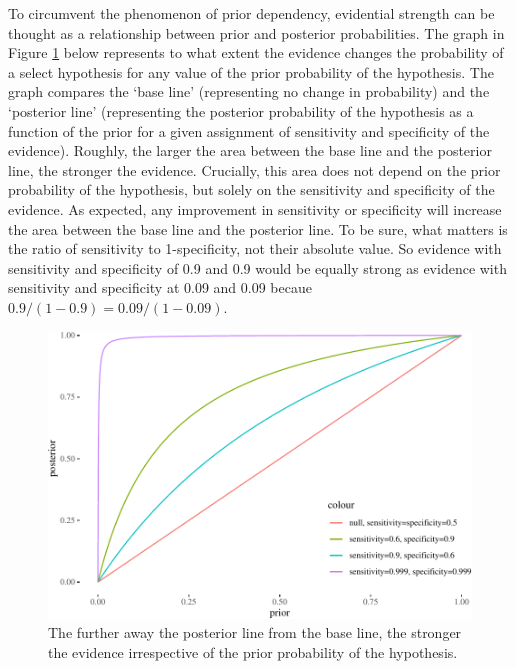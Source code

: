 \documentclass[
  10pt,
  dvipsnames,enabledeprecatedfontcommands]{scrartcl}
\begin{document}
To circumvent the phenomenon of prior dependency, evidential strength
can be thought as a relationship between prior and posterior
probabilities. The graph in Figure \ref{fig:strength-prior-post} below
represents to what extent the evidence changes the probability of a
select hypothesis for any value of the prior probability of the
hypothesis. The graph compares the `base line' (representing no change
in probability) and the `posterior line' (representing the posterior
probability of the hypothesis as a function of the prior for a given
assignment of sensitivity and specificity of the evidence). Roughly, the
larger the area between the base line and the posterior line, the
stronger the evidence. Crucially, this area does not depend on the prior
probability of the hypothesis, but solely on the sensitivity and
specificity of the evidence. As expected, any improvement in sensitivity
or specificity will increase the area between the base line and the
posterior line. To be sure, what matters is the ratio of sensitivity to
1-specificity, not their absolute value. So evidence with sensitivity
and specificity of 0.9 and 0.9 would be equally strong as evidence with
sensitivity and specificity at 0.09 and 0.09 becaue
\(0.9/(1-0.9) = 0.09/(1-0.09)\).

\begin{figure}


\begin{center}\includegraphics[width=0.9\linewidth]{conjunction-paradox_files/figure-latex/unnamed-chunk-7-1} \end{center}

\caption{The further away the posterior line from the base 
line, the stronger the evidence irrespective 
of the prior probability of the hypothesis.}
\label{fig:strength-prior-post}
\end{figure}
\end{document}
